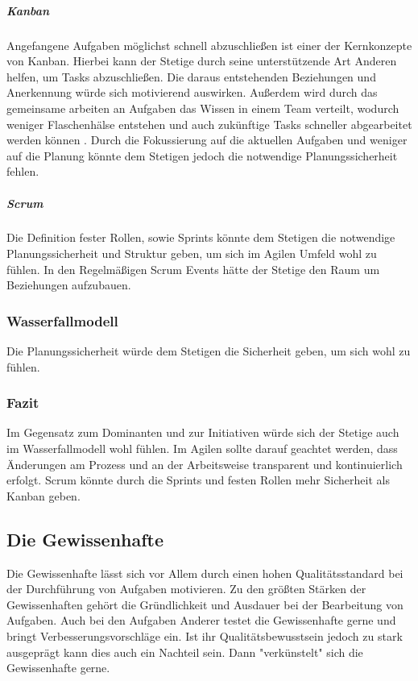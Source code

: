 \documentclass[twocolumn,10pt]{asme2ej}
\begin{document}
\subparagraph{Kanban} Angefangene Aufgaben möglichst schnell abzuschließen ist einer der Kernkonzepte von Kanban. Hierbei kann der Stetige durch seine unterstützende Art Anderen helfen, um Tasks abzuschließen. Die daraus entstehenden Beziehungen und Anerkennung würde sich motivierend auswirken. Außerdem wird durch das gemeinsame arbeiten an Aufgaben das Wissen in einem Team verteilt, wodurch weniger Flaschenhälse entstehen und auch zukünftige Tasks schneller abgearbeitet werden können \cite{kanban}. Durch die Fokussierung auf die aktuellen Aufgaben und weniger auf die Planung könnte dem Stetigen jedoch die notwendige Planungssicherheit fehlen.

\subparagraph{Scrum} Die Definition fester Rollen, sowie Sprints könnte dem Stetigen die notwendige Planungssicherheit und Struktur geben, um sich im Agilen Umfeld wohl zu fühlen. In den Regelmäßigen Scrum Events hätte der Stetige den Raum um Beziehungen aufzubauen.

\subsubsection{Wasserfallmodell}
Die Planungssicherheit würde dem Stetigen die Sicherheit geben, um sich wohl zu fühlen. 

\subsubsection{Fazit}
Im Gegensatz zum Dominanten und zur Initiativen würde sich der Stetige auch im Wasserfallmodell wohl fühlen. Im Agilen sollte darauf geachtet werden, dass Änderungen am Prozess und an der Arbeitsweise transparent und kontinuierlich erfolgt. Scrum könnte durch die Sprints und festen Rollen mehr Sicherheit als Kanban geben. 
 
\subsection{Die Gewissenhafte}
Die Gewissenhafte lässt sich vor Allem durch einen hohen Qualitätsstandard bei der Durchführung von Aufgaben motivieren. Zu den größten Stärken der Gewissenhaften gehört die Gründlichkeit und Ausdauer bei der Bearbeitung von Aufgaben. Auch bei den Aufgaben Anderer testet die Gewissenhafte gerne und bringt Verbesserungsvorschläge ein. Ist ihr Qualitätsbewusstsein jedoch zu stark ausgeprägt kann dies auch ein Nachteil sein. Dann "verkünstelt" sich die Gewissenhafte gerne.
\end{document}
